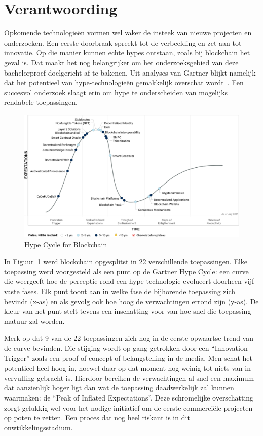 \section{Verantwoording}
\label{sec:verantwoording}

Opkomende technologieën vormen wel vaker de insteek van nieuwe projecten en onderzoeken. Een eerste doorbraak spreekt tot de verbeelding en zet aan tot innovatie. Op die manier kunnen echte hypes ontstaan, zoals bij blockchain het geval is. Dat maakt het nog belangrijker om het onderzoeksgebied van deze bachelorproef doelgericht af te bakenen. Uit analyses van Gartner blijkt namelijk dat het potentieel van hype-technologieën gemakkelijk overschat wordt~\autocite{Kietzmann2018}. Een succesvol onderzoek slaagt erin om hype te onderscheiden van mogelijks rendabele toepassingen.

\begin{figure}[H]
	\includegraphics[width=\textwidth]{img/inleiding/gartner-hypecycle.png}
	\caption{\label{fig:gartner}Hype Cycle for Blockchain~\autocite{Gartner2021}}
\end{figure}

In Figuur~\ref{fig:gartner} werd blockchain opgesplitst in 22 verschillende toepassingen. Elke toepassing werd voorgesteld als een punt op de Gartner Hype Cycle: een curve die weergeeft hoe de perceptie rond een hype-technologie evolueert doorheen vijf vaste fases. Elk punt toont aan in welke fase de bijhorende toepassing zich bevindt (x-as) en als gevolg ook hoe hoog de verwachtingen errond zijn (y-as). De kleur van het punt stelt tevens een inschatting voor van hoe snel die toepassing matuur zal worden. 

Merk op dat 9 van de 22 toepassingen zich nog in de eerste opwaartse trend van de curve bevinden.
Die stijging wordt op gang getrokken door  een ``Innovation Trigger'' zoals een proof-of-concept of belangstelling in de media. Men schat het potentieel heel hoog in, hoewel daar op dat moment nog weinig tot niets van in vervulling gebracht is. Hierdoor bereiken de verwachtingen al snel een maximum dat aanzienlijk hoger ligt dan wat de toepassing daadwerkelijk zal kunnen waarmaken: de ``Peak of Inflated Expectations''. Deze schromelijke overschatting zorgt gelukkig wel voor het nodige initiatief om de eerste commerciële projecten op poten te zetten. Een proces dat nog heel riskant is in dit onwtikkelingsstadium.

